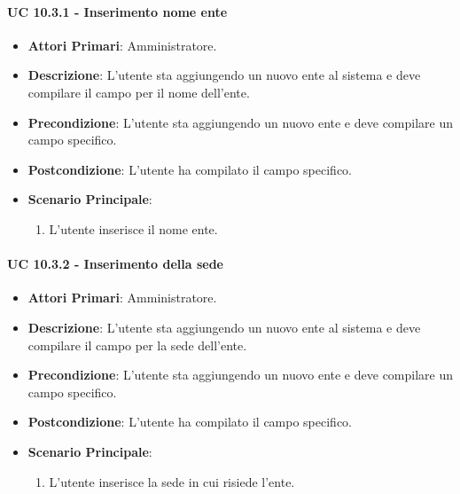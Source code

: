 			\paragraph{UC 10.3.1 - Inserimento nome ente}
			\begin{itemize}
				\item \textbf{Attori Primari}: Amministratore.
				\item \textbf{Descrizione}: L'utente sta aggiungendo un nuovo ente al sistema e deve compilare il campo per il nome dell'ente.
				\item \textbf{Precondizione}: L'utente sta aggiungendo un nuovo ente e deve compilare un campo specifico.
				\item \textbf{Postcondizione}: L'utente ha compilato il campo specifico.
				\item \textbf{Scenario Principale}:
				\begin{enumerate}
					\item L'utente inserisce il nome ente.
				\end{enumerate}	
			\end{itemize}	

			\paragraph{UC 10.3.2 - Inserimento della sede}
			\begin{itemize}
				\item \textbf{Attori Primari}: Amministratore.
				\item \textbf{Descrizione}: L'utente sta aggiungendo un nuovo ente al sistema e deve compilare il campo per la sede dell'ente.
				\item \textbf{Precondizione}: L'utente sta aggiungendo un nuovo ente e deve compilare un campo specifico.
				\item \textbf{Postcondizione}: L'utente ha compilato il campo specifico.
				\item \textbf{Scenario Principale}:
				\begin{enumerate}
					\item L'utente inserisce la sede in cui risiede l'ente.
				\end{enumerate}	
			\end{itemize}			

